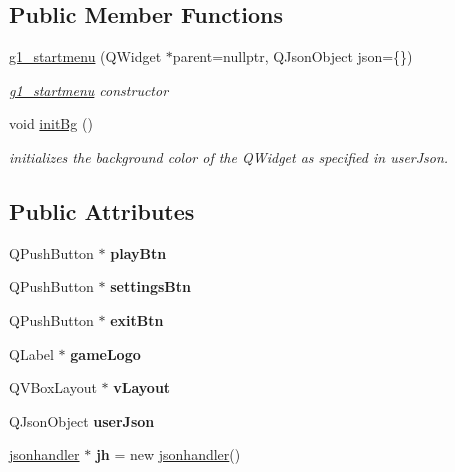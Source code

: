 \subsection*{Public Member Functions}
\begin{DoxyCompactItemize}
\item 
\hyperlink{classg1__startmenu_a85efd01ba5b2843e490b702a1aef8f67}{g1\+\_\+startmenu} (Q\+Widget $\ast$parent=nullptr, Q\+Json\+Object json=\{\})
\begin{DoxyCompactList}\small\item\em \hyperlink{classg1__startmenu}{g1\+\_\+startmenu} constructor \end{DoxyCompactList}\item 
\mbox{\label{classg1__startmenu_a96cff080e23c1f6e7d75f0b47fe24800}} 
void \hyperlink{classg1__startmenu_a96cff080e23c1f6e7d75f0b47fe24800}{init\+Bg} ()
\begin{DoxyCompactList}\small\item\em initializes the background color of the Q\+Widget as specified in user\+Json. \end{DoxyCompactList}\end{DoxyCompactItemize}
\subsection*{Public Attributes}
\begin{DoxyCompactItemize}
\item 
\mbox{\label{classg1__startmenu_af39d038c880f2d60b7a8e4a2785faeb4}} 
Q\+Push\+Button $\ast$ {\bfseries play\+Btn}
\item 
\mbox{\label{classg1__startmenu_a8ec350993f5096be76ad481808025b21}} 
Q\+Push\+Button $\ast$ {\bfseries settings\+Btn}
\item 
\mbox{\label{classg1__startmenu_a526f72b8dc747f347b2c31c55166250b}} 
Q\+Push\+Button $\ast$ {\bfseries exit\+Btn}
\item 
\mbox{\label{classg1__startmenu_a10b3391a59fa86be94f89987a16a22da}} 
Q\+Label $\ast$ {\bfseries game\+Logo}
\item 
\mbox{\label{classg1__startmenu_a4ff85a91adfdd0b0937da42bba4575c3}} 
Q\+V\+Box\+Layout $\ast$ {\bfseries v\+Layout}
\item 
\mbox{\label{classg1__startmenu_ad9784249c69bcdc1e1200e1b44f01800}} 
Q\+Json\+Object {\bfseries user\+Json}
\item 
\mbox{\label{classg1__startmenu_af6590c97835676c09579e42f34cc34a3}} 
\hyperlink{classjsonhandler}{jsonhandler} $\ast$ {\bfseries jh} = new \hyperlink{classjsonhandler}{jsonhandler}()
\end{DoxyCompactItemize}


